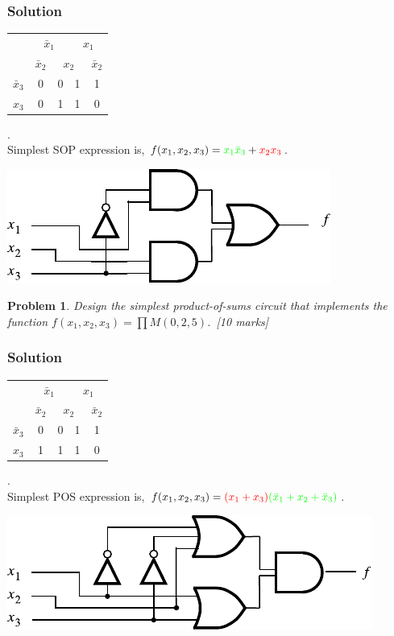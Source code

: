 \documentclass[twocolumn]{article}
\newtheorem{prob}{Problem}
\newcommand{\bx}{\bar{x}}
\begin{document}
\subsubsection*{Solution}

\begin{tabular}{c|c|c|c|c}
  \toprule
  & \multicolumn{2}{c|}{$\bx_1$} & \multicolumn{2}{c}{$x_1$}
  \\
  & $\bx_2$ & \multicolumn{2}{c|}{$x_2$} & $\bx_2$
  \\ \midrule
  $\bx_3$ & 0 & 0 & {\color{green}1} & {\color{green}1}
  \\
  $x_3$ & 0 & {\color{red}1} & {\color{red}1} & 0
  \\\bottomrule
\end{tabular}.
\\
Simplest SOP expression is, $f(x_1, x_2, x_3) = {\color{green}x_1 \bx_3} +
{\color{red}x_2 x_3} $.

\includegraphics[width=\linewidth]{fig/prob-7-sop-circuit.pdf}

\begin{prob}
Design the simplest product-of-sums circuit that implements the function $f (x_1 , x_2 , x_3 ) = \prod M (0, 2, 5)$.~\cite[Prob 2.22]{brown2013fundamentals}[10 marks]
\end{prob}
\subsubsection*{Solution}
\begin{tabular}{c|c|c|c|c}
  \toprule
  & \multicolumn{2}{c|}{$\bx_1$} & \multicolumn{2}{c}{$x_1$}
  \\
  & $\bx_2$ & \multicolumn{2}{c|}{$x_2$} & $\bx_2$
  \\ \midrule
  $\bx_3$ & {\color{red}0} & {\color{red}0} & 1 & 1
  \\
  $x_3$ & 1 & 1 & 1 & {\color{green}0}
  \\\bottomrule
\end{tabular}.
\\

Simplest POS expression is, $f(x_1, x_2, x_3) = {\color{red}(x_1 +
  x_3)}{\color{green}(\bx_1 + x_2 + \bx_3)} $.

\includegraphics[width=\linewidth]{fig/prob-8-pos-circuit.pdf}




\end{document}

